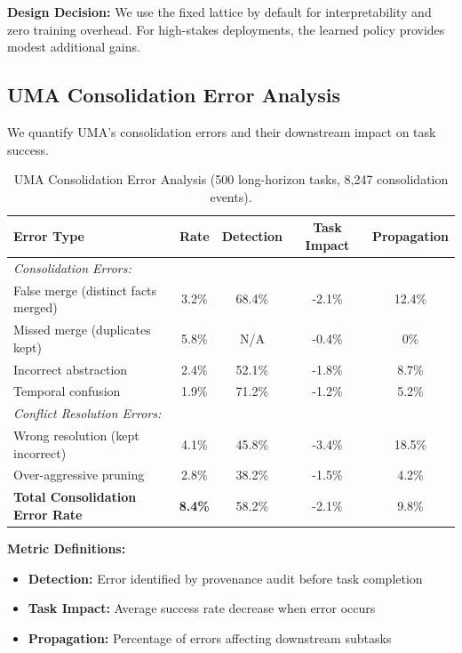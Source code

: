 \documentclass{article}
\theoremstyle{plain}
\theoremstyle{definition}
\theoremstyle{remark}
\begin{document}
\textbf{Design Decision:} We use the fixed lattice by default for interpretability and zero training overhead. For high-stakes deployments, the learned policy provides modest additional gains.

\subsection{UMA Consolidation Error Analysis}
\label{sec:uma_consolidation_errors}

We quantify UMA's consolidation errors and their downstream impact on task success.

\begin{table}[h]
	\caption{UMA Consolidation Error Analysis (500 long-horizon tasks, 8,247 consolidation events).}
	\label{tab:uma_errors}
	\centering
	\small
	\begin{tabular}{@{}lcccc@{}}
		\toprule
		\textbf{Error Type} & \textbf{Rate} & \textbf{Detection} & \textbf{Task Impact} & \textbf{Propagation} \\
		\midrule
		\multicolumn{5}{l}{\textit{Consolidation Errors:}} \\
		\quad False merge (distinct facts merged) & 3.2\% & 68.4\% & -2.1\% & 12.4\% \\
		\quad Missed merge (duplicates kept) & 5.8\% & N/A & -0.4\% & 0\% \\
		\quad Incorrect abstraction & 2.4\% & 52.1\% & -1.8\% & 8.7\% \\
		\quad Temporal confusion & 1.9\% & 71.2\% & -1.2\% & 5.2\% \\
		\midrule
		\multicolumn{5}{l}{\textit{Conflict Resolution Errors:}} \\
		\quad Wrong resolution (kept incorrect) & 4.1\% & 45.8\% & -3.4\% & 18.5\% \\
		\quad Over-aggressive pruning & 2.8\% & 38.2\% & -1.5\% & 4.2\% \\
		\midrule
		\textbf{Total Consolidation Error Rate} & \textbf{8.4\%} & 58.2\% & -2.1\% & 9.8\% \\
		\bottomrule
	\end{tabular}
\end{table}

\textbf{Metric Definitions:}
\begin{itemize}[nosep,leftmargin=*]
	\item \textbf{Detection:} Error identified by provenance audit before task completion
	\item \textbf{Task Impact:} Average success rate decrease when error occurs
	\item \textbf{Propagation:} Percentage of errors affecting downstream subtasks
\end{itemize}
\end{document}
